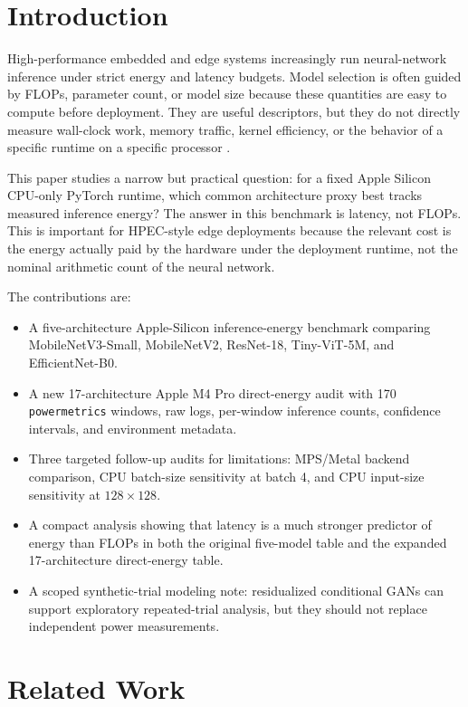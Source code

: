 \documentclass[conference]{IEEEtran}
\begin{document}
\section{Introduction}

High-performance embedded and edge systems increasingly run neural-network
inference under strict energy and latency budgets. Model selection is often
guided by FLOPs, parameter count, or model size because these quantities are
easy to compute before deployment. They are useful descriptors, but they do
not directly measure wall-clock work, memory traffic, kernel efficiency, or
the behavior of a specific runtime on a specific processor \cite{horowitz2014,
eyeriss2016, mobilenetv3}.

This paper studies a narrow but practical question: for a fixed Apple Silicon
CPU-only PyTorch runtime, which common architecture proxy best tracks measured
inference energy? The answer in this benchmark is latency, not FLOPs. This is
important for HPEC-style edge deployments because the relevant cost is the
energy actually paid by the hardware under the deployment runtime, not the
nominal arithmetic count of the neural network.

The contributions are:
\begin{itemize}
    \item A five-architecture Apple-Silicon inference-energy benchmark
    comparing MobileNetV3-Small, MobileNetV2, ResNet-18, Tiny-ViT-5M, and
    EfficientNet-B0.
    \item A new 17-architecture Apple M4 Pro direct-energy audit with 170
    \texttt{powermetrics} windows, raw logs, per-window inference counts,
    confidence intervals, and environment metadata.
    \item Three targeted follow-up audits for limitations: MPS/Metal backend
    comparison, CPU batch-size sensitivity at batch 4, and CPU input-size
    sensitivity at $128\times128$.
    \item A compact analysis showing that latency is a much stronger predictor
    of energy than FLOPs in both the original five-model table and the
    expanded 17-architecture direct-energy table.
    \item A scoped synthetic-trial modeling note: residualized conditional
    GANs can support exploratory repeated-trial analysis, but they should not
    replace independent power measurements.
\end{itemize}

\section{Related Work}
\end{document}
